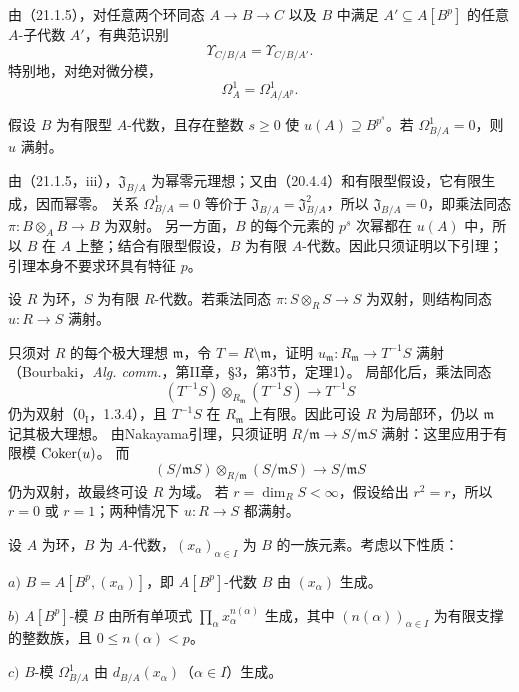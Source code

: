 由（21.1.5），对任意两个环同态 $A\to B\to C$ 以及 $B$ 中满足 $A'\subseteq A[B^p]$ 的任意 $A$-子代数 $A'$，有典范识别
\begin{equation}
 \Upsilon_{C/B/A}=\Upsilon_{C/B/A'}.
 \tag{21.1.5.1}
\end{equation}
特别地，对绝对微分模，
\begin{equation}
 \Omega^1_A=\Omega^1_{A/A^p}.
 \tag{21.1.5.2}
\end{equation}

假设 $B$ 为有限型 $A$-代数，且存在整数 $s\ge0$ 使 $u(A)\supseteq B^{p^s}$。若 $\Omega^1_{B/A}=0$，则 $u$ 满射。

\eproof
由（21.1.5，iii），$\mathfrak J_{B/A}$ 为幂零元理想；又由（20.4.4）和有限型假设，它有限生成，因而幂零。
关系 $\Omega^1_{B/A}=0$ 等价于 $\mathfrak J_{B/A}=\mathfrak J_{B/A}^2$，所以 $\mathfrak J_{B/A}=0$，即乘法同态
$\pi:B\otimes_A B\to B$ 为双射。
另一方面，$B$ 的每个元素的 $p^s$ 次幂都在 $u(A)$ 中，所以 $B$ 在 $A$ 上整；结合有限型假设，$B$ 为有限 $A$-代数。因此只须证明以下引理；引理本身不要求环具有特征 $p$。
\finishproof

设 $R$ 为环，$S$ 为有限 $R$-代数。若乘法同态 $\pi:S\otimes_R S\to S$ 为双射，则结构同态 $u:R\to S$ 满射。

\eproof
只须对 $R$ 的每个极大理想 $\mathfrak m$，令 $T=R\setminus\mathfrak m$，证明
$u_{\mathfrak m}:R_{\mathfrak m}\to T^{-1}S$ 满射
（Bourbaki，\textit{Alg. comm.}，第II章，§3，第3节，定理1）。
局部化后，乘法同态
\[
 (T^{-1}S)\otimes_{R_{\mathfrak m}}(T^{-1}S)\longrightarrow T^{-1}S
\]
仍为双射（$0_{\mathrm I}$，1.3.4），且 $T^{-1}S$ 在 $R_{\mathfrak m}$ 上有限。因此可设 $R$ 为局部环，仍以 $\mathfrak m$ 记其极大理想。
由Nakayama引理，只须证明 $R/\mathfrak m\to S/\mathfrak mS$ 满射：这里应用于有限模 $\operatorname{Coker}(u)$。
而
\[
 (S/\mathfrak mS)\otimes_{R/\mathfrak m}(S/\mathfrak mS)
 \longrightarrow S/\mathfrak mS
\]
仍为双射，故最终可设 $R$ 为域。
若 $r=\dim_R S<\infty$，假设给出 $r^2=r$，所以 $r=0$ 或 $r=1$；两种情况下 $u:R\to S$ 都满射。
\finishproof

设 $A$ 为环，$B$ 为 $A$-代数，$(x_\alpha)_{\alpha\in I}$ 为 $B$ 的一族元素。考虑以下性质：

$a)$ $B=A[B^p,(x_\alpha)]$，即 $A[B^p]$-代数 $B$ 由 $(x_\alpha)$ 生成。

$b)$ $A[B^p]$-模 $B$ 由所有单项式 $\prod_\alpha x_\alpha^{n(\alpha)}$ 生成，其中 $(n(\alpha))_{\alpha\in I}$ 为有限支撑的整数族，且 $0\le n(\alpha)<p$。

$c)$ $B$-模 $\Omega^1_{B/A}$ 由 $d_{B/A}(x_\alpha)$（$\alpha\in I$）生成。

